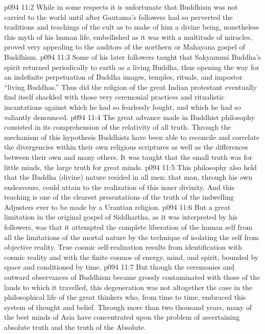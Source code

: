 \vs p094 11:2 \pc While in some respects it is unfortunate that Buddhism was not carried to the world until after Gautama’s followers had so perverted the traditions and teachings of the cult as to make of him a divine being, nonetheless this myth of his human life, embellished as it was with a multitude of miracles, proved very appealing to the auditors of the northern or Mahayana gospel of Buddhism.
\vs p094 11:3 Some of his later followers taught that Sakyamuni Buddha’s spirit returned periodically to earth as a living Buddha, thus opening the way for an indefinite perpetuation of Buddha images, temples, rituals, and impostor “living Buddhas.” Thus did the religion of the great Indian protestant eventually find itself shackled with those very ceremonial practices and ritualistic incantations against which he had so fearlessly fought, and which he had so valiantly denounced.
\vs p094 11:4 \pc The great advance made in Buddhist philosophy consisted in its comprehension of the relativity of all truth. Through the mechanism of this hypothesis Buddhists have been able to reconcile and correlate the divergencies within their own religious scriptures as well as the differences between their own and many others. It was taught that the small truth was for little minds, the large truth for great minds.
\vs p094 11:5 This philosophy also held that the Buddha (divine) nature resided in all men; that man, through his own endeavours, could attain to the realization of this inner divinity. And this teaching is one of the clearest presentations of the truth of the indwelling Adjusters ever to be made by a Urantian religion.
\vs p094 11:6 But a great limitation in the original gospel of Siddhartha, as it was interpreted by his followers, was that it attempted the complete liberation of the human self from all the limitations of the mortal nature by the technique of isolating the self from objective reality. True cosmic self\hyp{}realization results from identification with cosmic reality and with the finite cosmos of energy, mind, and spirit, bounded by space and conditioned by time.
\vs p094 11:7 But though the ceremonies and outward observances of Buddhism became grossly contaminated with those of the lands to which it travelled, this degeneration was not altogether the case in the philosophical life of the great thinkers who, from time to time, embraced this system of thought and belief. Through more than two thousand years, many of the best minds of Asia have concentrated upon the problem of ascertaining absolute truth and the truth of the Absolute.
